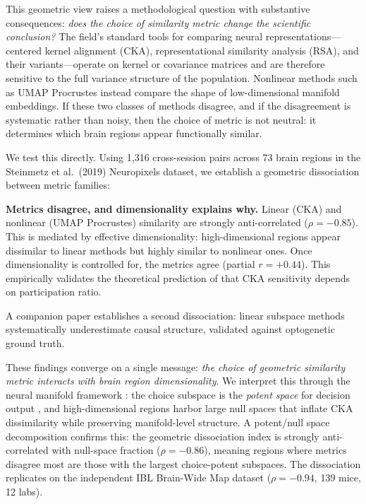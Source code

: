 \documentclass{article}
\begin{document}
This geometric view raises a methodological question with substantive consequences: \emph{does the choice of similarity metric change the scientific conclusion?} The field's standard tools for comparing neural representations---centered kernel alignment (CKA), representational similarity analysis (RSA), and their variants---operate on kernel or covariance matrices and are therefore sensitive to the full variance structure of the population. Nonlinear methods such as UMAP Procrustes instead compare the shape of low-dimensional manifold embeddings. If these two classes of methods disagree, and if the disagreement is systematic rather than noisy, then the choice of metric is not neutral: it determines which brain regions appear functionally similar.

We test this directly. Using 1,316 cross-session pairs across 73 brain regions in the Steinmetz et al.\ (2019) Neuropixels dataset, we establish a geometric dissociation between metric families:

\textbf{Metrics disagree, and dimensionality explains why.} Linear (CKA) and nonlinear (UMAP Procrustes) similarity are strongly anti-correlated ($\rho = -0.85$). This is mediated by effective dimensionality: high-dimensional regions appear dissimilar to linear methods but highly similar to nonlinear ones. Once dimensionality is controlled for, the metrics agree (partial $r = +0.44$). This empirically validates the theoretical prediction of \citet{harvey2024representational} that CKA sensitivity depends on participation ratio.

A companion paper establishes a second dissociation: linear subspace methods systematically underestimate causal structure, validated against optogenetic ground truth.

These findings converge on a single message: \emph{the choice of geometric similarity metric interacts with brain region dimensionality}. We interpret this through the neural manifold framework \citep{gallego2017neural}: the choice subspace is the \emph{potent space} for decision output \citep{kaufman2014cortical}, and high-dimensional regions harbor large null spaces that inflate CKA dissimilarity while preserving manifold-level structure. A potent/null space decomposition confirms this: the geometric dissociation index is strongly anti-correlated with null-space fraction ($\rho = -0.86$), meaning regions where metrics disagree most are those with the largest choice-potent subspaces. The dissociation replicates on the independent IBL Brain-Wide Map dataset ($\rho = -0.94$, 139 mice, 12 labs).
\end{document}
